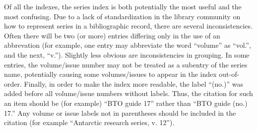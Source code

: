 Of all the indexes, the series index is both potentially the most useful and
the most confusing. Due to a lack of standardization in the library community
on how to represent series in a bibliographic record, there are several
inconsistencies. Often there will be two (or more) entries differing only in
the use of an abbrevation (for example, one entry may abbreviate the word
``volume'' as ``vol.'', and the next, ``v.''). Slightly less obvious are
inconsistencies in grouping. In some entries, the volume/issue number may not
be treated as a subentry of the series name, potentially causing some
volumes/issues to appear in the index out-of-order.  Finally, in order to make
the index more readable, the label ``(no.)'' was added before all volume/issue
numbers without labels. Thus, the citation for such an item should be (for
example) ``BTO guide 17'' rather than ``BTO guide (no.) 17.'' Any volume or issue
labels not in parentheses should be included in the citation (for example
``Antarctic research series, v. 12'').
